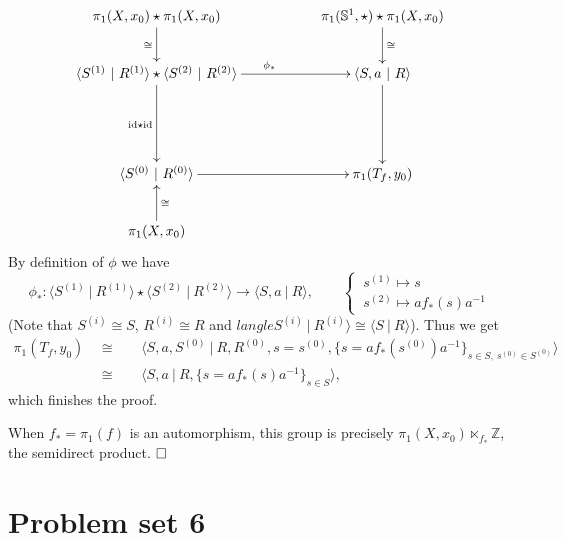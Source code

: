 \documentclass[11pt]{book}
\numberwithin{dummy}{section}
\theoremstyle{nonumberbreak}
\newenvironment{sol}[1][]{\ifthenelse{\equal{#1}{}}{\solution}{\solution[#1]}\rm}{\endsolution}
\newenvironment{prob}[1][]{\ifthenelse{\equal{#1}{}}{\problem}{\problem[#1]}\rm}{\endproblem}
\newcommand{\Sph}{\mathbb{S}}
\newcommand{\la}{\longrightarrow}
\newcommand{\id}{\mathrm{id}}
\newcommand{\Z}{\mathbb{Z}}
\begin{document}
\begin{spacing}{1.4}
\begin{prob}
\begin{sol}
\begin{compactenum}
$$
\begin{xy}
\xymatrix{
\pi_1(X,x_0) \star \pi_1(X,x_0)\ar[d]_{\cong} && \pi_1(\Sph^1, \star) \star \pi_1(X,x_0)  \ar[d]^{\cong} \\
\langle S^{(1)} \ \vert \ R^{(1)} \rangle \star \langle S^{(2)} \ \vert \ R^{(2)}\rangle \ar[rr]^{\phi_*} \ar[dd]_{\id \star \id} && \langle S,a \ \vert \ R \rangle \ar[dd] \\ && \\ \langle S^{(0)} \ \vert \ R^{(0)} \rangle  \ar[rr] &&\pi_1(T_f,y_0) \\
\pi_1(X,x_0) \ar[u]_{\cong}  &&
}
\end{xy}
$$
By definition of $\phi$ we have 
$$\phi_*: \langle S^{(1)} \ \vert \ R^{(1)} \rangle \star \langle S^{(2)} \ \vert \ R^{(2)} \rangle \la \langle S,a \ \vert \ R \rangle, \qquad \begin{cases} \ s^{(1)} \mapsto s \\ \ s^{(2)} \mapsto a f_*(s)a^{-1} \end{cases}$$
(Note that $S^{(i)} \cong S$, $R^{(i)} \cong R$ and $langle S^{(i)} \ \vert \ R^{(i)} \rangle \cong \langle S \ \vert \ R \rangle$). Thus we get 
\begin{alignat*}
\pi_1(T_f,y_0) \ \ &\cong&& \ \  \langle S,a,S^{(0)} \ \vert \ R, R^{(0)}, s=s^{(0)}, \{s=af_*(s^{(0)})a^{-1}\}_{s \in S, \ s^{(0)} \in S^{(0)}} \rangle\\
&\cong && \ \ \langle S,a \ \vert \ R, \{s=af_*(s)a^{-1}\}_{s \in S} \rangle,
\end{alignat*}
which finishes the proof.
\item When $f_* = \pi_1(f)$ is an automorphism, this group is precisely $\pi_1(X,x_0) \ltimes_{f_*} \Z$, the semidirect product. $\hfill \Box$
\end{compactenum}
\end{sol}
\end{prob}


\newpage













\titlespacing*{\section}{-16.5pt}{0pt}{20pt}
\renewcommand*\thesection{}
\section{Problem set 6} %
\renewcommand*\thesection{\arabic{section}}






\end{spacing}
\end{document}
